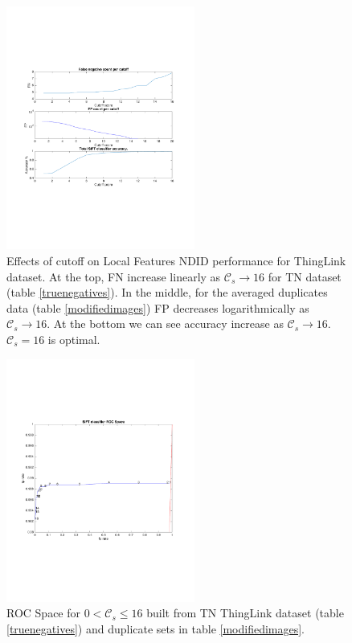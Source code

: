 \documentclass[english,12pt,a4paper,pdftex,elec,utf8]{aaltothesis}
\begin{document}
\begin{figure}[htb]
\begin{center}
\includegraphics[height=8cm]{figures/thinglink_SIFTCountROC}
\end{center}
\caption{ Effects of cutoff on Local Features NDID performance for ThingLink dataset. At the top, FN increase linearly as $\mathcal{C}_s \rightarrow 16$ for TN dataset (table \ref{truenegatives}). In the middle, for the averaged duplicates data (table \ref{modifiedimages}) FP decreases logarithmically as $\mathcal{C}_s \rightarrow 16$. At the bottom we can see accuracy increase as $\mathcal{C}_s \rightarrow 16$. $\mathcal{C}_s=16$ is optimal.}
\label{thinglinkfigcutoff}
\end{figure}


\begin{figure}[htb]
\begin{center}
\includegraphics[height=8cm]{figures/thinglink_SIFTROCperCutoff}
\end{center}
\caption{ ROC Space for $0 < \mathcal{C}_{s} \leq 16$ built from TN ThingLink dataset (table \ref{truenegatives}) and duplicate sets in table \ref{modifiedimages}.}
\label{thinglinkfigcutoffrocspace}
\end{figure}
\end{document}
